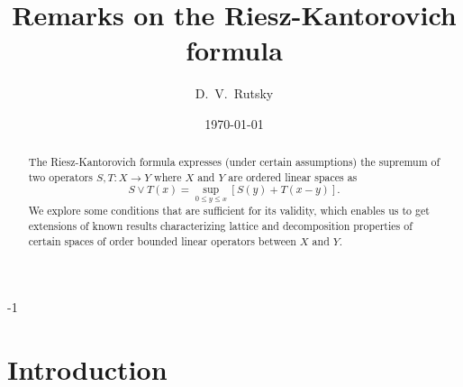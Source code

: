 \documentclass [a4paper, 12pt] {amsart}
\begin{document}
\title {Remarks on the Riesz-Kantorovich formula}
\author {D.~V.~Rutsky}
\date {\today}
\address {St.Petersburg Department
of Steklov Mathematical Institute RAS
27, Fontanka
191023 St.Petersburg
Russia}


\begin {abstract}
The Riesz-Kantorovich formula expresses (under certain assumptions)
the supremum of two operators
$S, T : X \to Y$ where $X$ and $Y$ are ordered linear spaces as
$$
S \vee T (x) = \sup_{0 \leqslant y \leqslant x} [S (y) + T (x - y)].
$$
We explore some conditions that are sufficient for its validity, which enables us to get extensions of known results
characterizing lattice and decomposition properties of certain spaces of order bounded linear operators between $X$ and $Y$.
\end {abstract}

\maketitle

\setcounter {section} {-1}

\section {Introduction}

\label {anintroduction}

\end{document}
